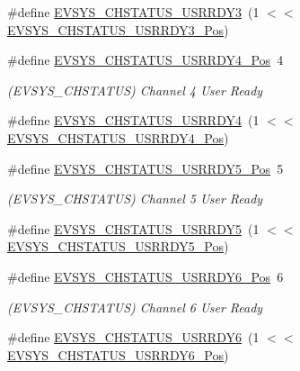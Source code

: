 \begin{DoxyCompactItemize}
\#define \mbox{\hyperlink{group___s_a_m_d21___e_v_s_y_s_ga768229bbe19fa55f5b415de981e8d38b}{E\+V\+S\+Y\+S\+\_\+\+C\+H\+S\+T\+A\+T\+U\+S\+\_\+\+U\+S\+R\+R\+D\+Y3}}~(1 $<$$<$ \mbox{\hyperlink{group___s_a_m_d21___e_v_s_y_s_gaadc4166c437dd04d3bbebda33e9c1b0e}{E\+V\+S\+Y\+S\+\_\+\+C\+H\+S\+T\+A\+T\+U\+S\+\_\+\+U\+S\+R\+R\+D\+Y3\+\_\+\+Pos}})
\item 
\#define \mbox{\hyperlink{group___s_a_m_d21___e_v_s_y_s_gaceb6034b235b555a339b73d43f8cb131}{E\+V\+S\+Y\+S\+\_\+\+C\+H\+S\+T\+A\+T\+U\+S\+\_\+\+U\+S\+R\+R\+D\+Y4\+\_\+\+Pos}}~4
\begin{DoxyCompactList}\small\item\em (E\+V\+S\+Y\+S\+\_\+\+C\+H\+S\+T\+A\+T\+US) Channel 4 User Ready \end{DoxyCompactList}\item 
\#define \mbox{\hyperlink{group___s_a_m_d21___e_v_s_y_s_gab02e201ca0df582b917de4899f071e1e}{E\+V\+S\+Y\+S\+\_\+\+C\+H\+S\+T\+A\+T\+U\+S\+\_\+\+U\+S\+R\+R\+D\+Y4}}~(1 $<$$<$ \mbox{\hyperlink{group___s_a_m_d21___e_v_s_y_s_gaceb6034b235b555a339b73d43f8cb131}{E\+V\+S\+Y\+S\+\_\+\+C\+H\+S\+T\+A\+T\+U\+S\+\_\+\+U\+S\+R\+R\+D\+Y4\+\_\+\+Pos}})
\item 
\#define \mbox{\hyperlink{group___s_a_m_d21___e_v_s_y_s_gaaf955de97c5f6b558e914263bc2bf125}{E\+V\+S\+Y\+S\+\_\+\+C\+H\+S\+T\+A\+T\+U\+S\+\_\+\+U\+S\+R\+R\+D\+Y5\+\_\+\+Pos}}~5
\begin{DoxyCompactList}\small\item\em (E\+V\+S\+Y\+S\+\_\+\+C\+H\+S\+T\+A\+T\+US) Channel 5 User Ready \end{DoxyCompactList}\item 
\#define \mbox{\hyperlink{group___s_a_m_d21___e_v_s_y_s_gab6f50a61d9c8ff0c18cf2d588e4b2258}{E\+V\+S\+Y\+S\+\_\+\+C\+H\+S\+T\+A\+T\+U\+S\+\_\+\+U\+S\+R\+R\+D\+Y5}}~(1 $<$$<$ \mbox{\hyperlink{group___s_a_m_d21___e_v_s_y_s_gaaf955de97c5f6b558e914263bc2bf125}{E\+V\+S\+Y\+S\+\_\+\+C\+H\+S\+T\+A\+T\+U\+S\+\_\+\+U\+S\+R\+R\+D\+Y5\+\_\+\+Pos}})
\item 
\#define \mbox{\hyperlink{group___s_a_m_d21___e_v_s_y_s_gafaf5a0a89bdfed909362fda66cf0a3b0}{E\+V\+S\+Y\+S\+\_\+\+C\+H\+S\+T\+A\+T\+U\+S\+\_\+\+U\+S\+R\+R\+D\+Y6\+\_\+\+Pos}}~6
\begin{DoxyCompactList}\small\item\em (E\+V\+S\+Y\+S\+\_\+\+C\+H\+S\+T\+A\+T\+US) Channel 6 User Ready \end{DoxyCompactList}\item 
\#define \mbox{\hyperlink{group___s_a_m_d21___e_v_s_y_s_gad1c96f670d441653281e229a16bb5576}{E\+V\+S\+Y\+S\+\_\+\+C\+H\+S\+T\+A\+T\+U\+S\+\_\+\+U\+S\+R\+R\+D\+Y6}}~(1 $<$$<$ \mbox{\hyperlink{group___s_a_m_d21___e_v_s_y_s_gafaf5a0a89bdfed909362fda66cf0a3b0}{E\+V\+S\+Y\+S\+\_\+\+C\+H\+S\+T\+A\+T\+U\+S\+\_\+\+U\+S\+R\+R\+D\+Y6\+\_\+\+Pos}})

\end{DoxyCompactItemize}
